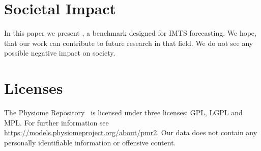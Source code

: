 \section{Societal Impact}\label{sec:ethics}
In this paper we present \Bench, a benchmark designed for IMTS forecasting.
We hope, that our work can contribute to future research in that field.
We do not see any possible negative impact on society.

\section{Licenses}\label{sec:licenses}
The Physiome Repository~\citep{Yu2011.Physiome} is licensed under three
licenses: GPL, LGPL and MPL\@.
For further information see \url{https://models.physiomeproject.org/about/pmr2}.
Our data does not contain any personally identifiable information or offensive
content.
